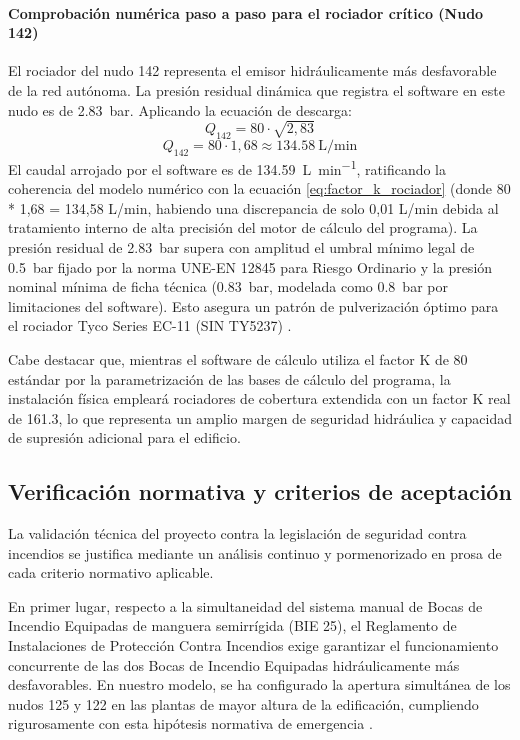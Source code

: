 \documentclass[12pt,a4paper]{article}
\begin{document}
\paragraph{Comprobación numérica paso a paso para el rociador crítico (Nudo 142)}
El rociador del nudo 142 representa el emisor hidráulicamente más desfavorable de la red autónoma. La presión residual dinámica que registra el software en este nudo es de \SI{2.83}{\bar}. Aplicando la ecuación de descarga:
\[ Q_{142} = 80 \cdot \sqrt{2,83} \]
\[ Q_{142} = 80 \cdot 1,68\approx \SI{134.58}{\liter\per\minute} \]
El caudal arrojado por el software es de \SI{134.59}{\liter\per\minute}, ratificando la coherencia del modelo numérico con la ecuación \ref{eq:factor_k_rociador} (donde 80 * 1,68 = 134,58 L/min, habiendo una discrepancia de solo 0,01 L/min debida al tratamiento interno de alta precisión del motor de cálculo del programa). La presión residual de \SI{2.83}{\bar} supera con amplitud el umbral mínimo legal de \SI{0.5}{\bar} fijado por la norma UNE-EN 12845 para Riesgo Ordinario y la presión nominal mínima de ficha técnica (\SI{0.83}{\bar}, modelada como \SI{0.8}{\bar} por limitaciones del software). Esto asegura un patrón de pulverización óptimo para el rociador Tyco Series EC-11 (SIN TY5237) \parencite{UNE_EN_12845,TYCO_EC11}.

Cabe destacar que, mientras el software de cálculo utiliza el factor K de 80 estándar por la parametrización de las bases de cálculo del programa, la instalación física empleará rociadores de cobertura extendida con un factor K real de 161.3, lo que representa un amplio margen de seguridad hidráulica y capacidad de supresión adicional para el edificio.

\subsection{Verificación normativa y criterios de aceptación}

La validación técnica del proyecto contra la legislación de seguridad contra incendios se justifica mediante un análisis continuo y pormenorizado en prosa de cada criterio normativo aplicable.

En primer lugar, respecto a la simultaneidad del sistema manual de Bocas de Incendio Equipadas de manguera semirrígida (BIE 25), el Reglamento de Instalaciones de Protección Contra Incendios exige garantizar el funcionamiento concurrente de las dos Bocas de Incendio Equipadas hidráulicamente más desfavorables. En nuestro modelo, se ha configurado la apertura simultánea de los nudos 125 y 122 en las plantas de mayor altura de la edificación, cumpliendo rigurosamente con esta hipótesis normativa de emergencia \parencite{RIPCI_GUIA_2022}. 
\end{document}
